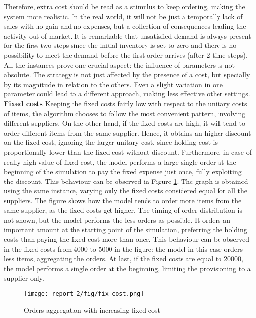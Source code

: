 \documentclass{article}
\begin{document}
Therefore, extra cost should be read as a stimulus to keep ordering, making the system more realistic. In the real world, it will not be just a temporally lack of sales with no gain and no expenses, but a collection of consequences leading the activity out of market. It is remarkable that unsatisfied demand is always present for the first two steps since the initial inventory is set to zero and there is no possibility to meet the demand before the first order arrives (after 2 time steps).
All the instances prove one crucial aspect: the influence of parameters is not absolute. The strategy is not just affected by the presence of a cost, but specially by its magnitude in relation to the others. Even a slight variation in one parameter could lead to a different approach, making less effective other settings. 
\newline
\noindent
\newline
\textbf{Fixed costs}\newline
Keeping the fixed costs fairly low with respect to the unitary costs of items, the algorithm chooses to follow the most convenient pattern, involving different suppliers. On the other hand, if the fixed costs are high, it will tend to order different items from the same supplier. Hence, it obtains an higher discount on the fixed cost, ignoring the larger unitary cost, since holding cost is proportionally lower than the fixed cost without discount.  
Furthermore, in case of really high value of fixed cost, the model performs a large single order at the beginning of the simulation to pay the fixed expense just once, fully exploiting the discount.
This behaviour can be observed in Figure \ref{fig:fix_cost}. The graph is obtained using the same instance, varying only the fixed costs considered equal for all the suppliers.
The figure shows how the model tends to order more items from the same supplier, as the fixed costs get higher. The timing of order distribution is not shown, but the model performs the less orders as possible. It orders an important amount at the starting point of the simulation, preferring the holding costs than paying the fixed cost more than once. This behaviour can be observed in the fixed costs from 4000 to 5000 in the figure: the model in this case orders less items, aggregating the orders. At last, if the fixed costs are equal to 20000, the model performs a single order at the beginning, limiting the provisioning to a supplier only.\par

\begin{figure}[!htb]
    \centering
    \texttt{[image: report-2/fig/fix\_cost.png]}
    \caption{Orders aggregation with increasing fixed cost}
    \label{fig:fix_cost}
\end{figure}
\end{document}

